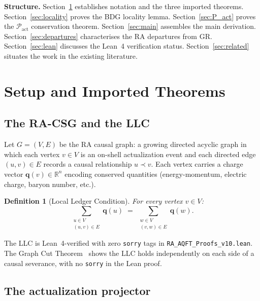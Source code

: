 \documentclass[11pt,a4paper]{article}
\newtheorem{definition}[theorem]{Definition}
\newcommand{\Pact}{\mathcal{P}_{\mathrm{act}}}
\begin{document}
\medskip\noindent
\textbf{Structure.}
Section~\ref{sec:setup} establishes notation and the three imported
theorems. Section~\ref{sec:locality} proves the BDG locality lemma.
Section~\ref{sec:P_act} proves the $\Pact$ conservation theorem.
Section~\ref{sec:main} assembles the main derivation.
Section~\ref{sec:departures} characterises the RA departures from GR.
Section~\ref{sec:lean} discusses the Lean~4 verification status.
Section~\ref{sec:related} situates the work in the existing literature.

\section{Setup and Imported Theorems}
\label{sec:setup}

\subsection{The RA-CSG and the LLC}

Let $G = (V, E)$ be the RA causal graph: a growing directed acyclic
graph in which each vertex $v \in V$ is an on-shell actualization
event and each directed edge $(u,v) \in E$ records a causal
relationship $u \prec v$. Each vertex carries a charge vector
$\mathbf{q}(v) \in \mathbb{R}^n$ encoding conserved quantities
(energy-momentum, electric charge, baryon number, etc.).

\begin{definition}[Local Ledger Condition]
\label{def:LLC}
For every vertex $v \in V$:
\begin{equation}
  \sum_{\substack{u \in V \\ (u,v)\in E}} \mathbf{q}(u)
  \;=\;
  \sum_{\substack{w \in V \\ (v,w)\in E}} \mathbf{q}(w).
\end{equation}
\end{definition}

\noindent
The LLC is Lean~4-verified with zero \texttt{sorry} tags in
\texttt{RA\_AQFT\_Proofs\_v10.lean}. The Graph Cut
Theorem~\citep{Sandeman2026RAGC} shows the LLC holds independently on
each side of a causal severance, with no \texttt{sorry} in the Lean
proof.

\subsection{The actualization projector}
\end{document}
